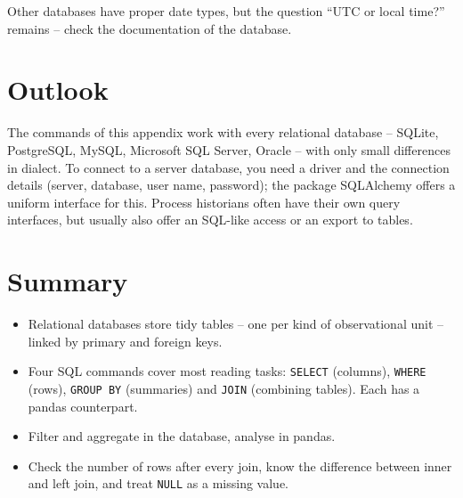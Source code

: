 \documentclass[
  letterpaper,
  DIV=11,
  numbers=noendperiod]{scrreprt}
\providecommand{\tightlist}{%
  \setlength{\itemsep}{0pt}\setlength{\parskip}{0pt}}\usepackage{longtable,booktabs,array}
\begin{document}
Other databases have proper date types, but the question ``UTC or local
time?'' remains -- check the documentation of the database.

\section{Outlook}\label{outlook-1}

The commands of this appendix work with every relational database --
SQLite, PostgreSQL, MySQL, Microsoft SQL Server, Oracle -- with only
small differences in dialect. To connect to a server database, you need
a driver and the connection details (server, database, user name,
password); the package SQLAlchemy offers a uniform interface for this.
Process historians often have their own query interfaces, but usually
also offer an SQL-like access or an export to tables.

\section{Summary}\label{summary-13}

\begin{tcolorbox}[enhanced jigsaw, left=2mm, title=\textcolor{quarto-callout-important-color}{\faExclamation}\hspace{0.5em}{Key takeaways}, opacityback=0, breakable, rightrule=.15mm, arc=.35mm, toptitle=1mm, colbacktitle=quarto-callout-important-color!10!white, opacitybacktitle=0.6, coltitle=black, colframe=quarto-callout-important-color-frame, bottomrule=.15mm, leftrule=.75mm, bottomtitle=1mm, titlerule=0mm, toprule=.15mm, colback=white]

\begin{itemize}
\tightlist
\item
  Relational databases store tidy tables -- one per kind of
  observational unit -- linked by primary and foreign keys.
\item
  Four SQL commands cover most reading tasks: \texttt{SELECT} (columns),
  \texttt{WHERE} (rows), \texttt{GROUP\ BY} (summaries) and
  \texttt{JOIN} (combining tables). Each has a pandas counterpart.
\item
  Filter and aggregate in the database, analyse in pandas.
\item
  Check the number of rows after every join, know the difference between
  inner and left join, and treat \texttt{NULL} as a missing value.
\end{itemize}

\end{tcolorbox}
\end{document}

